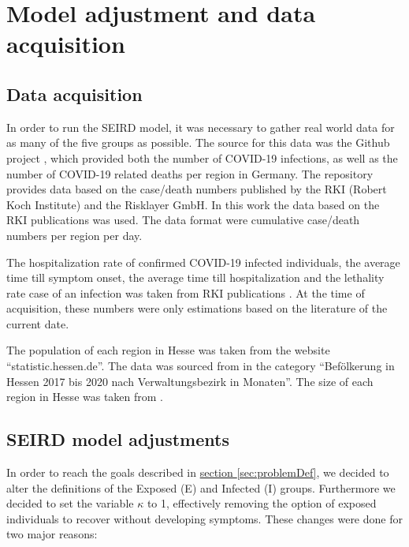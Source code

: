 \section{Model adjustment and data acquisition}


\subsection{Data acquisition}
\label{sec:datacoll}
In order to run the SEIRD model, it was necessary to gather real world data for as many of the five groups as possible.
The source for this data was the Github project \cite{Gehrcke}, which provided both the number of COVID-19 infections,
as well as the number of COVID-19 related deaths per region in Germany. The repository provides data based on the case/death
numbers published by the RKI (Robert Koch Institute) and the Risklayer GmbH. In this work the data based on the RKI publications
was used. The data format were cumulative case/death numbers per region per day.\newline

\par
The hospitalization rate of confirmed COVID-19 infected individuals, the average time till symptom onset, the average time till
hospitalization and the lethality rate case of an infection was taken from RKI publications \cite{RKIcov}. At the time of acquisition, these
numbers were only estimations based on the literature of the current date.\newline

\par
The population of each region in Hesse was taken from the website ``statistic.hessen.de''. The data was sourced from \cite{HessePop}
in the category ``Bef\"olkerung in Hessen 2017 bis 2020 nach Verwaltungsbezirk in Monaten''. The size of each region in Hesse
was taken from \cite{HesseSize}.

\subsection{SEIRD model adjustments}
\label{sec:SEIRDredef}
In order to reach the goals described in \hyperref[sec:problemDef]{section \ref*{sec:problemDef}}, we decided to alter
the definitions of the Exposed (E) and Infected (I) groups. Furthermore we decided to set the variable
$\kappa$ to 1, effectively removing the option of exposed individuals to recover without developing symptoms. These
changes were done for two major reasons:\newline

